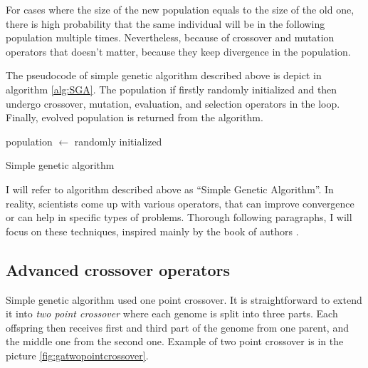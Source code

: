 For cases where the size of the new population equals to the size of the old one, there is high probability that the same individual will be in the following population multiple times. Nevertheless, because of crossover and mutation operators that doesn't matter, because they keep divergence in the population.

The pseudocode of simple genetic algorithm described above is depict in algorithm \ref{alg:SGA}. The population if firstly randomly initialized and then undergo crossover, mutation, evaluation, and selection operators in the loop. Finally, evolved population is returned from the algorithm.

\begin{algorithm}
    population $\leftarrow$ randomly initialized\;
    \caption{Simple genetic algorithm}
    \label{alg:SGA}
\end{algorithm}

I will refer to algorithm described above as \enquote{Simple Genetic Algorithm}. In reality, scientists come up with various operators, that can improve convergence or can help in specific types of problems. Thorough following paragraphs, I will focus on these techniques, inspired mainly by the book of authors \citet*{IntroToGA}.

\subsection{Advanced crossover operators}

Simple genetic algorithm used one point crossover. It is straightforward to extend it into \emph{two point crossover} where each genome is split into three parts. Each offspring then receives first and third part of the genome from one parent, and the middle one from the second one. Example of two point crossover is in the picture \ref{fig:gatwopointcrossover}.

